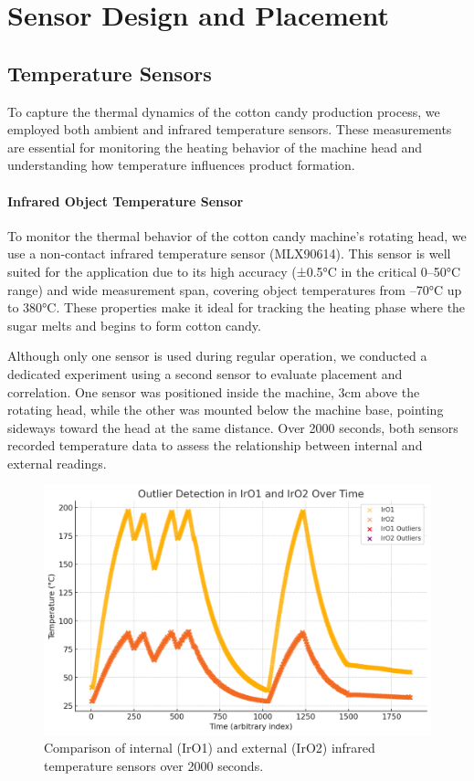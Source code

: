 \section{Sensor Design and Placement}
\subsection{Temperature Sensors}
To capture the thermal dynamics of the cotton candy production process, we employed both ambient and infrared temperature sensors. These measurements are essential for monitoring the heating behavior of the machine head and understanding how temperature influences product formation.

\paragraph{Infrared Object Temperature Sensor}
To monitor the thermal behavior of the cotton candy machine's rotating head, we use a non-contact infrared temperature sensor (MLX90614). This sensor is well suited for the application due to its high accuracy (±0.5°C in the critical 0–50°C range) and wide measurement span, covering object temperatures from --70°C up to 380°C. These properties make it ideal for tracking the heating phase where the sugar melts and begins to form cotton candy.

Although only one sensor is used during regular operation, we conducted a dedicated experiment using a second sensor to evaluate placement and correlation. One sensor was positioned inside the machine, 3cm above the rotating head, while the other was mounted below the machine base, pointing sideways toward the head at the same distance. Over 2000 seconds, both sensors recorded temperature data to assess the relationship between internal and external readings.

\begin{figure}[h]
    \centering
    \includegraphics[width=0.85\linewidth]{figures/IrO1 and IrO2 Over Time.png}
    \caption{Comparison of internal (IrO1) and external (IrO2) infrared temperature sensors over 2000 seconds.}
    \label{fig:ir-comparison}
\end{figure}

